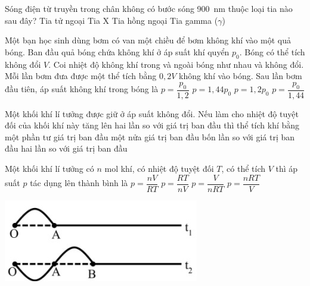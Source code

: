 \begin{ex}
	Sóng điện từ truyền trong chân không có bước sóng \SI{900}{\nano\meter} thuộc loại tia nào sau đây?
	\choice
	{Tia tử ngoại}
	{Tia X}
	{\True Tia hồng ngoại}
	{Tia gamma ($\gamma$)}
	\loigiai{}
\end{ex}
\begin{ex}
Một bạn học sinh dùng bơm có van một chiều để bơm không khí vào một quả bóng. Ban đầu quả bóng chứa không khí ở áp suất khí quyển $p_0$. Bóng có thể tích không đổi $V$. Coi nhiệt độ không khí trong và ngoài bóng như nhau và không đổi. Mỗi lần bơm đưa được một thể tích bằng $0,2V$ không khí vào bóng. Sau lần bơm đầu tiên, áp suất không khí trong bóng là	
	\choice
	{$p=\dfrac{p_0}{1,2}$}
	{$p=1,44p_0$}
	{\True $p=1,2p_0$}
	{$p=\dfrac{p_0}{1,44}$}
\end{ex}
\begin{ex}
	Một khối khí lí tưởng được giữ ở áp suất không đổi. Nếu làm cho nhiệt độ tuyệt đối của khối khí này tăng lên hai lần so với giá trị ban đầu thì thể tích khí bằng
	\choice
	{một phần tư giá trị ban đầu}
	{một nửa giá trị ban đầu}
	{bốn lần so với giá trị ban đầu}
	{\True hai lần so với giá trị ban đầu}
	\loigiai{}
\end{ex}
\begin{ex}
Một khối khí lí tưởng có $n$ mol khí, có nhiệt độ tuyệt đối $T$, có thể tích $V$ thì áp suất $p$ tác dụng lên thành bình là	
	\choice
	{$p=\dfrac{nV}{RT}$}
	{$p=\dfrac{RT}{nV}$}
	{$p=\dfrac{V}{nRT}$}
	{\True $p=\dfrac{nRT}{V}$}
	\loigiai{}
\end{ex}
{\includegraphics[scale=0.9]{../figs/FINAL-SEM1-005-6}}
